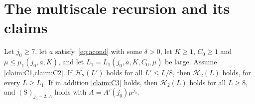\documentclass[11pt,letterpaper]{article}
\begin{document}
\section{The multiscale recursion and its claims}
\label{sec:recursion}

\begin{theorem}
\label{thm:multiscale}
Let $j_0\ge7$, let $a$ satisfy~\eqref{eq:acond} with some $\delta>0$, let $K\ge1$, $C_0\ge1$ and $\mu\le\mu_1(j_0,a,K)$, and let $L_1=L_1(j_0,a,K,C_0,\mu)$ be large. Assume \cref{claim:C1,claim:C2}. If $\mathcal H_2(L')$ holds for all $L'\le L/8$, then $\mathcal H_2(L)$ holds, for every $L\ge L_1$. If in addition \cref{claim:C3} holds, then $\mathcal H_2(L)$ holds for all $L\ge8$, and $\mathrm{(S)}_{j_0-2,A}$ holds with $A=A'(j_0)\mu^{j_0}$.
\end{theorem}
\end{document}

